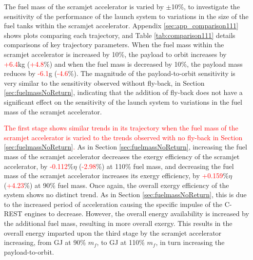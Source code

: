 The fuel mass of the scramjet accelerator is varied by $\pm$10\%, to investigate the sensitivity of the performance of the launch system to variations in the size of the fuel tanks within the scramjet accelerator. 
Appendix \ref{sec:app_comparison111} shows plots comparing each trajectory, and Table \ref{tab:comparison111} details comparisons of key trajectory parameters. 
When the fuel mass within the scramjet accelerator is increased by 10\%, the payload to orbit increases by \textcolor{red}{+6.4}kg (\textcolor{red}{+4.8}\%) and when the fuel mass is decreased by 10\%, the payload mass reduces by \textcolor{red}{-6.1}g (\textcolor{red}{-4.6}\%). The magnitude of the payload-to-orbit sensitivity is very similar to the sensitivity observed without fly-back, in Section \ref{sec:fuelmassNoReturn}, indicating that the addition of fly-back does not have a significant effect on the sensitivity of the launch system to variations in the fuel mass of the scramjet accelerator. 


\textcolor{red}{
The first stage shows similar trends in its trajectory when the fuel mass of the scramjet accelerator is varied to the trends observed with no fly-back in Section \ref{sec:fuelmassNoReturn}.}
As in Section \ref{sec:fuelmassNoReturn}, increasing the fuel mass of the scramjet accelerator decreases the exergy efficiency of the scramjet accelerator, by \textcolor{red}{-0.112}\%$\eta$ (\textcolor{red}{-2.98}\%) at 110\% fuel mass, and decreasing the fuel mass of the scramjet accelerator increases its exergy efficiency, by \textcolor{red}{+0.159}\%$\eta$ (\textcolor{red}{+4.23}\%) at 90\% fuel mass. Once again, the overall exergy efficiency of the system shows no distinct trend. 
As in Section \ref{sec:fuelmassNoReturn}, this is due to the increased period of acceleration causing the specific impulse of the C-REST engines to decrease. However, the overall energy availability is increased by the additional fuel mass, resulting in more overall exergy. This results in the overall energy imparted upon the third stage by the scramjet accelerator increasing, from \secondExergythirdStagemFuelNinety GJ at 90\% $m_{f}$, to \secondExergythirdStagemFuelOneHundredTen GJ at 110\% $m_{f}$, in turn increasing the payload-to-orbit.




